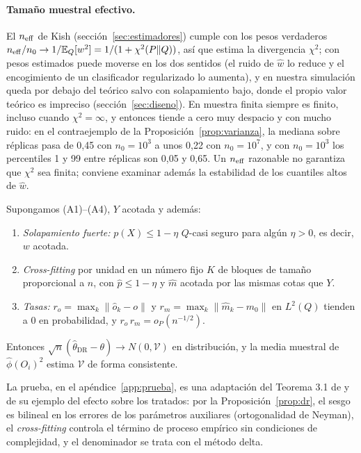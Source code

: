 \paragraph{Tamaño muestral efectivo.} El $n_{\mathrm{eff}}$ de Kish (sección~\ref{sec:estimadores}) cumple con los pesos verdaderos $n_{\mathrm{eff}}/n_0\to1/\mathbb{E}_Q[w^2]=1/(1+\chi^2(P\|Q))$, así que estima la divergencia $\chi^2$; con pesos estimados puede moverse en los dos sentidos (el ruido de $\hat w$ lo reduce y el encogimiento de un clasificador regularizado lo aumenta), y en nuestra simulación queda por debajo del teórico salvo con solapamiento bajo, donde el propio valor teórico es impreciso (sección~\ref{sec:diseno}). En muestra finita siempre es finito, incluso cuando $\chi^2=\infty$, y entonces tiende a cero muy despacio y con mucho ruido: en el contraejemplo de la Proposición~\ref{prop:varianza}, la mediana sobre réplicas pasa de 0,45 con $n_0=10^3$ a unos 0,22 con $n_0=10^7$, y con $n_0=10^3$ los percentiles 1 y 99 entre réplicas son 0,05 y 0,65. Un $n_{\mathrm{eff}}$ razonable no garantiza que $\chi^2$ sea finita; conviene examinar además la estabilidad de los cuantiles altos de $\hat w$.

\begin{teorema}\label{teo:normalidad}
Supongamos (A1)--(A4), $Y$ acotada y además:
\begin{enumerate}
  \item \emph{Solapamiento fuerte:} $p(X)\le1-\eta$ $Q$-casi seguro para algún $\eta>0$, es decir, $w$ acotada.
  \item \emph{Cross-fitting} por unidad en un número fijo $K$ de bloques de tamaño proporcional a $n$, con $\hat p\le1-\eta$ y $\hat m$ acotada por las mismas cotas que $Y$.
  \item \emph{Tasas:} $r_o=\max_k\|\hat o_k-o\|$ y $r_m=\max_k\|\hat m_k-m_0\|$ en $L^2(Q)$ tienden a 0 en probabilidad, y $r_o\,r_m=o_P(n^{-1/2})$.
\end{enumerate}
Entonces $\sqrt n(\hat\theta_{\mathrm{DR}}-\theta)\to N(0,\mathcal V)$ en distribución, y la media muestral de $\hat\phi(O_i)^2$ estima $\mathcal V$ de forma consistente.
\end{teorema}
La prueba, en el apéndice~\ref{app:prueba}, es una adaptación del Teorema 3.1 de \citet{chernozhukov2018} y de su ejemplo del efecto sobre los tratados: por la Proposición~\ref{prop:dr}, el sesgo es bilineal en los errores de los parámetros auxiliares (ortogonalidad de Neyman), el \emph{cross-fitting} controla el término de proceso empírico sin condiciones de complejidad, y el denominador se trata con el método delta.

